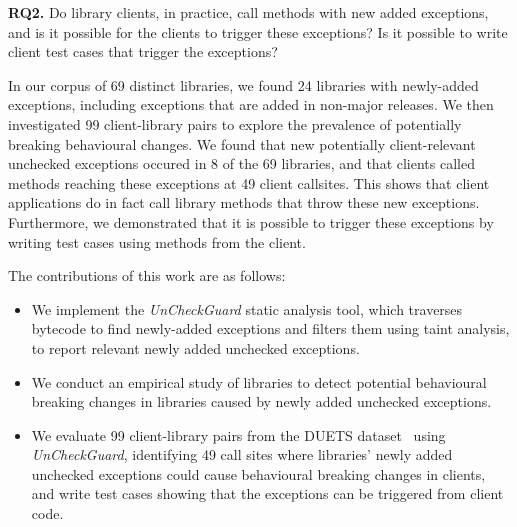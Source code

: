 \noindent
{\bf RQ2.} Do library clients, in practice, call methods with new added exceptions, and is it possible for the clients to trigger these exceptions? Is it possible to write client test cases that trigger the exceptions?

In our corpus of 69 distinct libraries, we found 24 libraries with newly-added exceptions, including exceptions that are added in non-major releases.
We then investigated 99 client-library pairs to explore the prevalence of potentially breaking behavioural changes.
We found that new potentially client-relevant unchecked exceptions occured in 8 of the 69 libraries, and that clients called methods reaching these exceptions at 49 client callsites.
This shows that client applications do in fact call library methods that throw these new exceptions.
Furthermore, we demonstrated that it is possible to trigger these exceptions by writing test cases using methods from the client.

The contributions of this work are as follows:

\begin{itemize}
    \item We implement the \textit{UnCheckGuard} static analysis tool, which traverses bytecode to find newly-added exceptions and filters them using taint analysis, to report relevant newly added unchecked exceptions.
    \item We conduct an empirical study of libraries to detect potential behavioural breaking changes in libraries caused by newly added unchecked exceptions.
    \item We evaluate 99 client-library pairs from the DUETS dataset~\cite{durieux21:_duets} using \textit{UnCheckGuard}, identifying 49 call sites where libraries' newly added unchecked exceptions could cause behavioural breaking changes in clients, and write test cases showing that the exceptions can be triggered from client code.
\end{itemize}